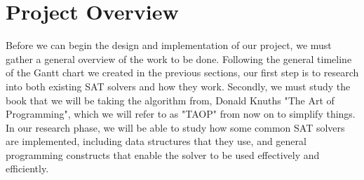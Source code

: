 \documentclass{article}
\begin{document}

\section{Project Overview}
Before we can begin the design and implementation of our project, we must gather a general overview of the work to be done. Following the general timeline
of the Gantt chart we created in the previous sections, our first step is to research into both existing SAT solvers and how they work. Secondly, we must
study the book that we will be taking the algorithm from, Donald Knuths "The Art of Programming", which we will refer to as "TAOP" from now on to simplify
things. In our research phase, we will be able to study how some common SAT solvers are implemented, including data structures that they use, and general
programming constructs that enable the solver to be used effectively and efficiently.



\end{document}
